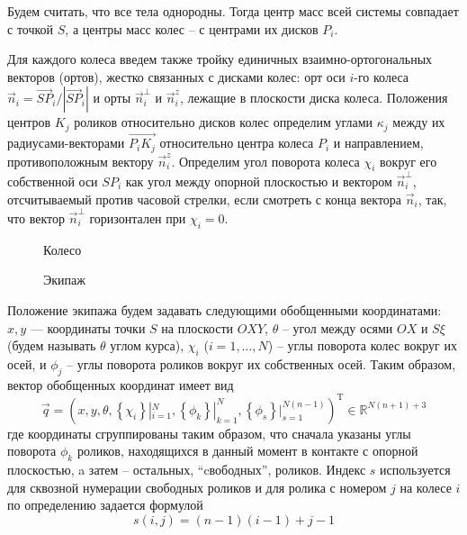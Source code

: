 Будем считать, что все тела однородны. Тогда центр масс всей системы совпадает с точкой $S$, а центры масс колес -- с центрами их дисков $P_i$.

Для каждого колеса введем также тройку единичных взаимно-ортогональных векторов (ортов), жестко связанных с дисками колес: орт оси $i$-го колеса $\vec{n}_i = \vec{SP}_i/|\vec{SP}_i|$ и орты $\vec{n}_i^\perp$ и $\vec{n}_i^z$, лежащие в плоскости диска колеса. Положения центров $K_j$ роликов относительно дисков колес определим углами $\kappa_j$ между их радиусами-векторами $\overrightarrow{P_iK_j}$ относительно центра колеса $P_i$ и направлением, противоположным вектору $\vec{n}_i^z$. Определим угол поворота колеса $\chi_i$ вокруг его собственной оси $SP_i$ как угол между опорной плоскостью и вектором $\vec{n}_i^\perp$, отсчитываемый против часовой стрелки, если смотреть с конца вектора $\vec{n}_i$, так, что вектор $\vec{n}_i^\perp$ горизонтален при $\chi_i = 0$.

\begin{figure}[h]
        \centering
        \caption{Колесо}
        \label{fig:wheel}
    \endminipage
        \centering
        \caption{Экипаж}
        \label{fig:vehicle}
    \endminipage
\end{figure}

Положение экипажа будем задавать следующими обобщенными координатами:
$x, y$ --- координаты точки $S$ на плоскости $OXY$, $\theta$ -- угол между осями $OX$ и $S\xi$ (будем называть $\theta$ углом курса),
$\chi_i$ ($i = 1,\dots,N$) -- углы поворота колес вокруг их осей, и $\phi_j$ -- углы поворота роликов вокруг их собственных осей.
Таким образом, вектор обобщенных координат имеет вид
$$\vec{q} = (
    x, y, \theta,
    \left\{\chi_i\right\}|_{i=1}^N,
    \left\{\phi_k\right\}|_{k=1}^N,
    \left\{\phi_s\right\}|_{s=1}^{N(n - 1)}
)^{\mathop{T}}\in\mathbb{R}^{N(n+1) + 3}$$ 
где координаты сгруппированы таким образом, что сначала указаны углы поворота $\phi_k$ роликов, находящихся в данный момент в контакте с опорной плоскостью, a затем -- остальных, ``cвободных'', роликов. Индекс $s$ используется для сквозной нумерации свободных роликов и для ролика с номером $j$ на колесе $i$ по определению задается формулой
\begin{equation}\label{eq:num}
    s(i, j) = (n-1)(i-1) + j - 1
\end{equation}


